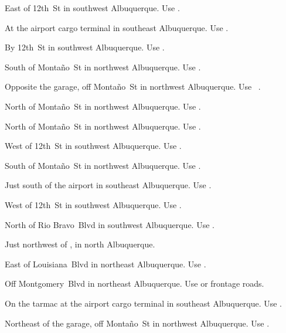 
\begin{LocationList}

East of 12th~St in southwest Albuquerque.
Use  .

At the airport cargo terminal in southeast Albuquerque.
Use  .

By 12th~St in southwest Albuquerque.
Use  .

South of Monta\~no~St in northwest Albuquerque.
Use  .

Opposite the garage, off Monta\~no~St in northwest Albuquerque.
Use~ .

\Location{\GarageHQ \Garage}
North of Monta\~no~St in northwest Albuquerque.
Use  .

North of Monta\~no~St in northwest Albuquerque.
Use  .

West of 12th~St in southwest Albuquerque.
Use  .

South of Monta\~no~St in northwest Albuquerque.
Use  .

Just south of the airport in southeast Albuquerque.
Use  .

West of 12th~St in southwest Albuquerque.
Use  .

North of Rio Bravo~Blvd in southwest Albuquerque.
Use  .

Just northwest of  , in north Albuquerque.

East of Louisiana~Blvd in northeast Albuquerque.
Use  .

\Location{\TruckStop \Gas \Rest}
Off Montgomery~Blvd in northeast Albuquerque.
Use   or frontage roads.

On the tarmac at the airport cargo terminal in southeast Albuquerque.
Use  .

Northeast of the garage, off Monta\~no~St in northwest Albuquerque.
Use  .

\end{LocationList}


